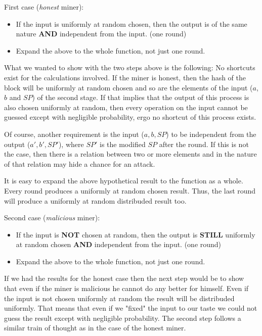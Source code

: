 First case (\emph{honest} miner):
\begin{itemize}
  \item If the input is uniformly at random chosen, then the output is of the same nature \textbf{AND} independent from the input. (one round)
  \item Expand the above to the whole function, not just one round.
\end{itemize}

What we wanted to show with the two steps above is the following: No shortcuts exist for the calculations involved. If the miner is honest, then the hash of the block will be uniformly at random chosen and so are the elements of the input ($a$, $b$ and $SP$) of the second stage. If that implies that the output of this process is also chosen uniformly at random, then every operation on the input cannot be guessed except with negligible probability, ergo no shortcut of this process exists.

Of course, another requirement is the input ($a,b,SP$) to be independent from the output ($a',b',SP'$), where $SP'$ is the modified $SP$ after the round. If this is not the case, then there is a relation between two or more elements and in the nature of that relation may hide a chance for an attack.

It is easy to expand the above hypothetical result to the function as a whole. Every round produces a uniformly at random chosen result. Thus, the last round will produce a uniformly at random distribuded result too.

Second case (\emph{malicious} miner):
\begin{itemize}
  \item If the input is \textbf{NOT} chosen at random, then the output is \textbf{STILL} uniformly at random chosen \textbf{AND} independent from the input. (one round)
  \item Expand the above to the whole function, not just one round.
\end{itemize}

If we had the results for the honest case then the next step would be to show that even if the miner is malicious he cannot do any better for himself. Even if the input is not chosen uniformly at random the result will be distribuded uniformly. That means that even if we "fixed" the input to our taste we could not guess the result except with negligible probability. The second step follows a similar train of thought as in the case of the honest miner.

